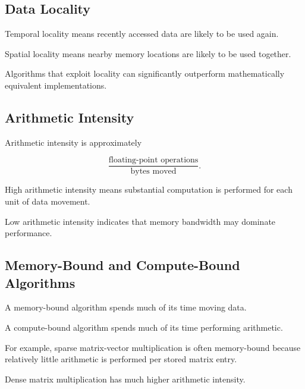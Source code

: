 \subsection{Data Locality}
\label{subsec:data-locality}

Temporal locality means recently accessed data are likely to be used
again.

Spatial locality means nearby memory locations are likely to be used
together.

Algorithms that exploit locality can significantly outperform
mathematically equivalent implementations.

\subsection{Arithmetic Intensity}
\label{subsec:arithmetic-intensity}

Arithmetic intensity is approximately

\[
\boxed{
\frac{
\text{floating-point operations}
}{
\text{bytes moved}
}.
}
\]

High arithmetic intensity means substantial computation is performed for
each unit of data movement.

Low arithmetic intensity indicates that memory bandwidth may dominate
performance.

\subsection{Memory-Bound and Compute-Bound Algorithms}
\label{subsec:memory-compute-bound}

A memory-bound algorithm spends much of its time moving data.

A compute-bound algorithm spends much of its time performing arithmetic.

For example, sparse matrix-vector multiplication is often memory-bound
because relatively little arithmetic is performed per stored matrix
entry.

Dense matrix multiplication has much higher arithmetic intensity.

